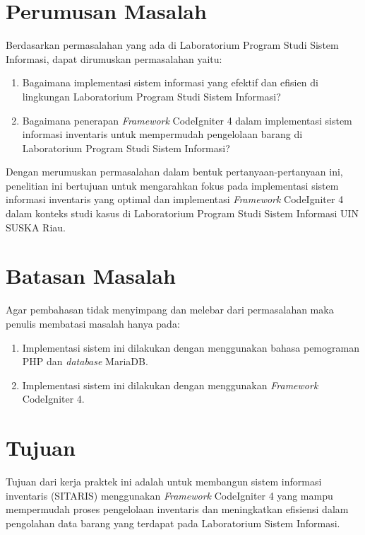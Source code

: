 \section{Perumusan Masalah}
Berdasarkan permasalahan yang ada di Laboratorium Program Studi Sistem Informasi, dapat dirumuskan permasalahan yaitu:
\begin{enumerate}
  \item Bagaimana implementasi sistem informasi yang efektif dan efisien di lingkungan Laboratorium Program Studi Sistem Informasi?
  \item Bagaimana penerapan \textit{Framework} CodeIgniter 4 dalam implementasi sistem informasi inventaris untuk mempermudah pengelolaan barang di Laboratorium Program Studi Sistem Informasi?
\end{enumerate}

Dengan merumuskan permasalahan dalam bentuk pertanyaan-pertanyaan ini, penelitian ini bertujuan untuk mengarahkan fokus pada implementasi sistem informasi inventaris yang optimal dan implementasi \textit{Framework} CodeIgniter 4 dalam konteks studi kasus di Laboratorium Program Studi Sistem Informasi UIN SUSKA Riau.

\section{Batasan Masalah}
Agar pembahasan tidak menyimpang dan melebar dari permasalahan maka penulis membatasi masalah hanya pada:
\begin{enumerate}
  \item Implementasi sistem ini dilakukan dengan menggunakan bahasa pemograman PHP dan  \textit{database} MariaDB.
  \item Implementasi sistem ini dilakukan dengan menggunakan \textit{Framework} CodeIgniter 4.
\end{enumerate}

\section{Tujuan}
Tujuan dari kerja praktek ini adalah untuk membangun sistem informasi inventaris (SITARIS) menggunakan \textit{Framework} CodeIgniter 4 yang mampu mempermudah proses pengelolaan inventaris dan meningkatkan efisiensi dalam pengolahan data barang yang terdapat pada Laboratorium Sistem Informasi.

